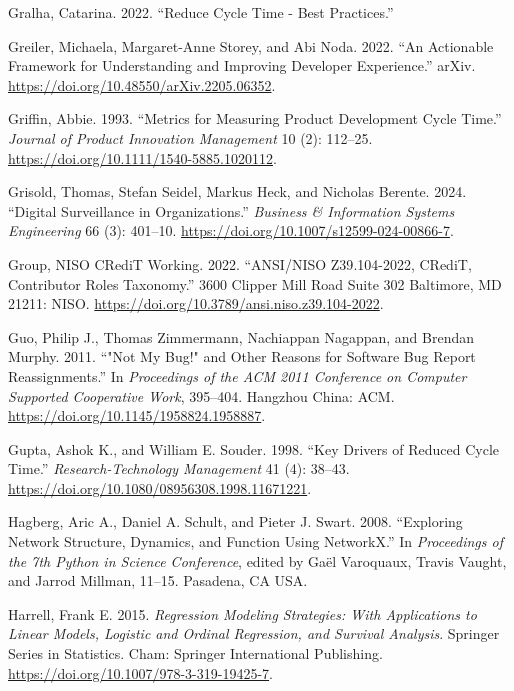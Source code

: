 \documentclass[
]{article}
\newlength{\cslhangindent}
\newenvironment{CSLReferences}[2] %
 {\begin{list}{}{%
  \setlength{\itemindent}{0pt}
  \setlength{\leftmargin}{0pt}
  \setlength{\parsep}{0pt}
  \ifodd #1
   \setlength{\leftmargin}{\cslhangindent}
   \setlength{\itemindent}{-1\cslhangindent}
  \fi
  \setlength{\itemsep}{#2\baselineskip}}}
 {\end{list}}
\begin{document}
\begin{CSLReferences}{1}{0}
Gralha, Catarina. 2022. {``Reduce Cycle Time - Best Practices.''}

Greiler, Michaela, Margaret-Anne Storey, and Abi Noda. 2022. {``An
{Actionable Framework} for {Understanding} and {Improving Developer
Experience}.''} arXiv. \url{https://doi.org/10.48550/arXiv.2205.06352}.

Griffin, Abbie. 1993. {``Metrics for {Measuring Product Development
Cycle Time}.''} \emph{Journal of Product Innovation Management} 10 (2):
112--25. \url{https://doi.org/10.1111/1540-5885.1020112}.

Grisold, Thomas, Stefan Seidel, Markus Heck, and Nicholas Berente. 2024.
{``Digital {Surveillance} in {Organizations}.''} \emph{Business \&
Information Systems Engineering} 66 (3): 401--10.
\url{https://doi.org/10.1007/s12599-024-00866-7}.

Group, NISO CRediT Working. 2022. {``{ANSI}/{NISO Z39}.104-2022,
{CRediT}, {Contributor Roles Taxonomy}.''} 3600 Clipper Mill Road Suite
302 Baltimore, MD 21211: NISO.
\url{https://doi.org/10.3789/ansi.niso.z39.104-2022}.

Guo, Philip J., Thomas Zimmermann, Nachiappan Nagappan, and Brendan
Murphy. 2011. {``"{Not} My Bug!" and Other Reasons for Software Bug
Report Reassignments.''} In \emph{Proceedings of the {ACM} 2011
Conference on {Computer} Supported Cooperative Work}, 395--404. Hangzhou
China: ACM. \url{https://doi.org/10.1145/1958824.1958887}.

Gupta, Ashok K., and William E. Souder. 1998. {``Key {Drivers} of
{Reduced Cycle Time}.''} \emph{Research-Technology Management} 41 (4):
38--43. \url{https://doi.org/10.1080/08956308.1998.11671221}.

Hagberg, Aric A., Daniel A. Schult, and Pieter J. Swart. 2008.
{``Exploring Network Structure, Dynamics, and Function Using
{NetworkX}.''} In \emph{Proceedings of the 7th Python in Science
Conference}, edited by Gaël Varoquaux, Travis Vaught, and Jarrod
Millman, 11--15. Pasadena, CA USA.

Harrell, Frank E. 2015. \emph{Regression {Modeling Strategies}: {With
Applications} to {Linear Models}, {Logistic} and {Ordinal Regression},
and {Survival Analysis}}. Springer {Series} in {Statistics}. Cham:
Springer International Publishing.
\url{https://doi.org/10.1007/978-3-319-19425-7}.


\end{CSLReferences}
\end{document}
